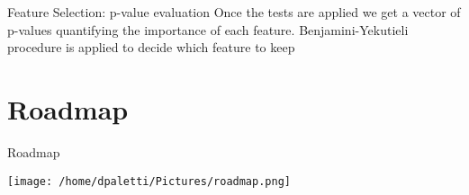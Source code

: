 \documentclass[presentation]{beamer}
\begin{document}
\begin{frame}[label={sec:org9dd9330}]{Feature Selection: p-value evaluation}
Once the tests are applied we get a \alert{vector of p-values} quantifying the importance of each feature. \newline
\alert{Benjamini-Yekutieli} procedure is applied to decide which feature to keep
\end{frame}
\section{Roadmap}
\label{sec:orgecfa351}
\begin{frame}[label={sec:orgcb24b3b}]{Roadmap}
\begin{center}
\texttt{[image: /home/dpaletti/Pictures/roadmap.png]}
\end{center}
\end{frame}
\end{document}
